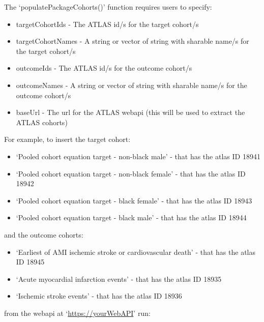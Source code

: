 \documentclass[
]{article}
\providecommand{\tightlist}{%
  \setlength{\itemsep}{0pt}\setlength{\parskip}{0pt}}
\begin{document}
The `populatePackageCohorts()' function requires users to specify:

\begin{itemize}
\tightlist
\item
  targetCohortIds - The ATLAS id/s for the target cohort/s
\item
  targetCohortNames - A string or vector of string with sharable name/s
  for the target cohort/s
\item
  outcomeIds - The ATLAS id/s for the outcome cohort/s
\item
  outcomeNames - A string or vector of string with sharable name/s for
  the outcome cohort/s
\item
  baseUrl - The url for the ATLAS webapi (this will be used to extract
  the ATLAS cohorts)
\end{itemize}

For example, to insert the target cohort:

\begin{itemize}
\tightlist
\item
  `Pooled cohort equation target - non-black male' - that has the atlas
  ID 18941
\item
  `Pooled cohort equation target - non-black female' - that has the
  atlas ID 18942
\item
  `Pooled cohort equation target - black female' - that has the atlas ID
  18943
\item
  `Pooled cohort equation target - black male' - that has the atlas ID
  18944
\end{itemize}

and the outcome cohorts:

\begin{itemize}
\tightlist
\item
  `Earliest of AMI ischemic stroke or cardiovascular death' - that has
  the atlas ID 18945
\item
  `Acute myocardial infarction events' - that has the atlas ID 18935
\item
  `Ischemic stroke events' - that has the atlas ID 18936
\end{itemize}

from the webapi at `\url{https://yourWebAPI}' run:
\end{document}
